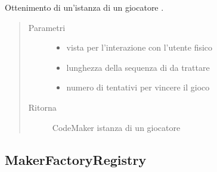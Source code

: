 \documentclass[letterpaper,10pt,italian,openany,oneside]{sphinxmanual}
\begin{document}
\begin{fulllineitems}
\label{\detokenize{source/it/unicam/cs/pa/mastermind/factories/MakerFactory:it.unicam.cs.pa.mastermind.factories.MakerFactory.getMaker(GameView, int, int)}}
Ottenimento di un’istanza di un giocatore .
\begin{quote}\begin{description}
\item[{Parametri}] \leavevmode\begin{itemize}
\item {} 
 \textendash{} vista per l’interazione con l’utente fisico

\item {} 
 \textendash{} lunghezza della sequenza di  da trattare

\item {} 
 \textendash{} numero di tentativi per vincere il gioco

\end{itemize}

\item[{Ritorna}] \leavevmode
CodeMaker istanza di un giocatore 

\end{description}\end{quote}

\end{fulllineitems}



\subsection{MakerFactoryRegistry}
\label{\detokenize{source/it/unicam/cs/pa/mastermind/factories/MakerFactoryRegistry:makerfactoryregistry}}\label{\detokenize{source/it/unicam/cs/pa/mastermind/factories/MakerFactoryRegistry::doc}}
\end{document}
